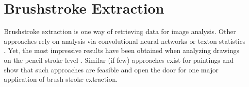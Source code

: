 











\section{Brushstroke Extraction}
Brushstroke extraction is one way of retrieving data for image analysis.
Other approaches rely on analysis via convolutional neural networks \cite{conv_based} or texton statistics \cite{textons}.
Yet, the most impressive results have been obtained when analyzing drawings on the pencil-stroke level \cite{picassomatissefake}.
Similar (if few) approaches exist for paintings and show that such approaches are feasible and open the door for one major application of brush stroke extraction.

